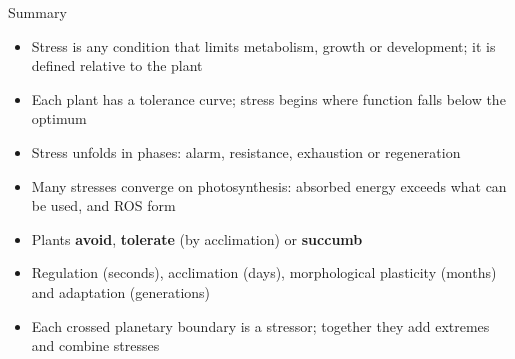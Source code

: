 \documentclass[aspectratio=169,11pt]{beamer}
\begin{document}
\begin{frame}{Summary}
\begin{itemize}
  \item Stress is any condition that limits metabolism, growth or development; it is defined relative to the plant
  \item Each plant has a tolerance curve; stress begins where function falls below the optimum
  \item Stress unfolds in phases: alarm, resistance, exhaustion or regeneration
  \item Many stresses converge on photosynthesis: absorbed energy exceeds what can be used, and ROS form
  \item Plants \textbf{avoid}, \textbf{tolerate} (by acclimation) or \textbf{succumb}
  \item Regulation (seconds), acclimation (days), morphological plasticity (months) and adaptation (generations)
  \item Each crossed planetary boundary is a stressor; together they add extremes and combine stresses
\end{itemize}
\end{frame}
\end{document}
